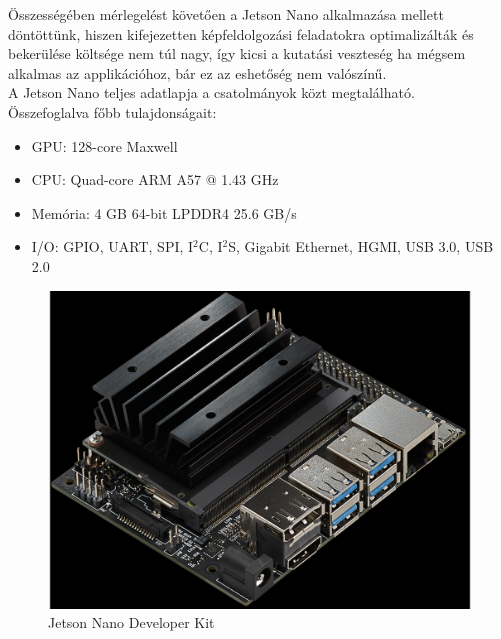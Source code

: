 \documentclass{article}
\begin{document}
Összességében mérlegelést követően a Jetson Nano alkalmazása mellett döntöttünk,
hiszen kifejezetten képfeldolgozási feladatokra optimalizálták és bekerülése költsége 
nem túl nagy, így kicsi a kutatási veszteség ha mégsem alkalmas az applikációhoz, bár ez 
az eshetőség nem valószínű.\vspace{5pt}\\
A Jetson Nano teljes adatlapja a csatolmányok közt megtalálható.\\
Összefoglalva főbb tulajdonságait:
\begin{itemize}
    \item GPU: 128-core Maxwell
    \item CPU: Quad-core ARM A57 @ 1.43 GHz
    \item Memória: 4 GB 64-bit LPDDR4 25.6 GB/s
    \item I/O: GPIO, UART, SPI, I$^2$C, I$^2$S, Gigabit Ethernet, HGMI, USB 3.0, USB 2.0
\end{itemize}
\begin{figure}
    \centering
    \includegraphics[scale = 0.3]{nano.png}
    \caption{Jetson Nano Developer Kit}
\end{figure}
\end{document}
